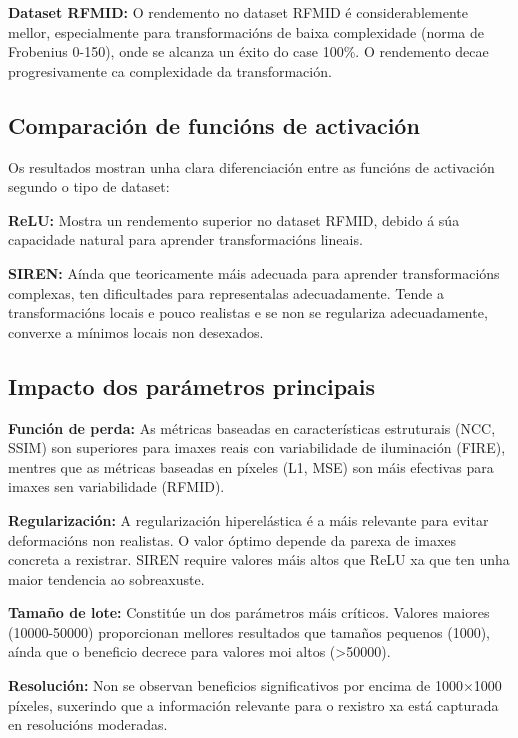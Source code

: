 \textbf{Dataset RFMID:} O rendemento no dataset RFMID é considerablemente mellor, especialmente para transformacións de baixa complexidade (norma de Frobenius 0-150), onde se alcanza un éxito do case 100\%. O rendemento decae progresivamente ca complexidade da transformación. 
\subsection{Comparación de funcións de activación}
\label{subsec:Comparación de funcións de activación}

Os resultados mostran unha clara diferenciación entre as funcións de activación segundo o tipo de dataset:

\textbf{ReLU:} Mostra un rendemento superior no dataset RFMID, debido á súa capacidade natural para aprender transformacións lineais.

\textbf{SIREN:} Aínda que teoricamente máis adecuada para aprender transformacións complexas, ten dificultades para representalas adecuadamente. Tende a transformacións locais e pouco realistas e se non se regulariza adecuadamente, converxe a mínimos locais non desexados.

\subsection{Impacto dos parámetros principais}
\label{subsec:Impacto dos parámetros principais}

\textbf{Función de perda:} As métricas baseadas en características estruturais (NCC, SSIM) son superiores para imaxes reais con variabilidade de iluminación (FIRE), mentres que as métricas baseadas en píxeles (L1, MSE) son máis efectivas para imaxes sen variabilidade (RFMID).

\textbf{Regularización:} A regularización hiperelástica é a máis relevante para evitar deformacións non realistas. O valor óptimo depende da parexa de imaxes concreta a rexistrar. SIREN require valores máis altos que ReLU xa que ten unha maior tendencia ao sobreaxuste.

\textbf{Tamaño de lote:} Constitúe un dos parámetros máis críticos. Valores maiores (10000-50000) proporcionan mellores resultados que tamaños pequenos (1000), aínda que o beneficio decrece para valores moi altos (>50000).

\textbf{Resolución:} Non se observan beneficios significativos por encima de 1000×1000 píxeles, suxerindo que a información relevante para o rexistro xa está capturada en resolucións moderadas.

